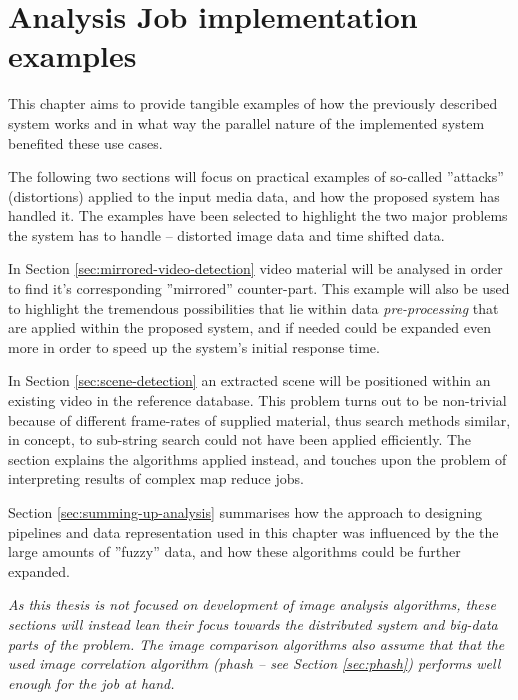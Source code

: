 \chapter{Analysis Job implementation examples}
\label{chap:analysis-examples}

This chapter aims to provide tangible examples of how the previously described system works and in what way the parallel nature of the implemented system benefited these use cases.

The following two sections will focus on practical examples of so-called ''attacks'' (distortions) applied to the input media data, and how the proposed system has handled it. The examples have been selected to highlight the two major problems the system has to handle -- distorted image data and time shifted data.

In Section \ref{sec:mirrored-video-detection} video material will be analysed in order to find it's corresponding ''mirrored'' counter-part. This example will also be used to highlight the tremendous possibilities that lie within data \textit{pre-processing} that are applied within the proposed system, and if needed could be expanded even more in order to speed up the system's initial response time.

In Section \ref{sec:scene-detection} an extracted scene will be positioned within an existing video in the reference database. This problem turns out to be non-trivial because of different frame-rates of supplied material, thus search methods similar, in concept, to sub-string search could not have been applied efficiently. The section explains the algorithms applied instead, and touches upon the problem of interpreting results of complex map reduce jobs.

Section \ref{sec:summing-up-analysis} summarises how the approach to designing pipelines and data representation used in this chapter was influenced by the the large amounts of ''fuzzy'' data, and how these algorithms could be further expanded.

\textit{As this thesis is not focused on development of image analysis algorithms, these sections will instead lean their focus towards the distributed system and big-data parts of the problem. The image comparison algorithms also assume that that the used image correlation algorithm (\textit{phash} -- see Section \ref{sec:phash}) performs well enough for the job at hand. }

